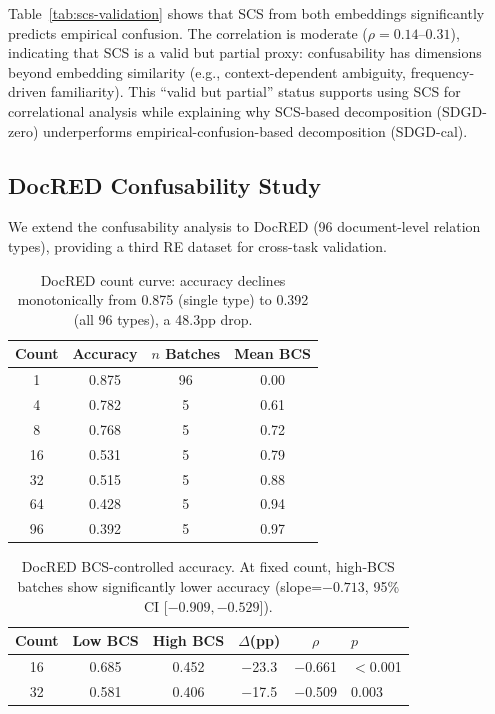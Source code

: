 \documentclass[11pt,a4paper]{article}
\begin{document}
Table~\ref{tab:scs-validation} shows that SCS from both embeddings significantly predicts empirical confusion.
The correlation is moderate ($\rho{=}0.14$--$0.31$), indicating that SCS is a valid but partial proxy: confusability has dimensions beyond embedding similarity (e.g., context-dependent ambiguity, frequency-driven familiarity).
This ``valid but partial'' status supports using SCS for correlational analysis while explaining why SCS-based decomposition (SDGD-zero) underperforms empirical-confusion-based decomposition (SDGD-cal).

\subsection{DocRED Confusability Study}
\label{sec:docred}

We extend the confusability analysis to DocRED (96 document-level relation types), providing a third RE dataset for cross-task validation.

\begin{table}[t]
\centering
\small
\begin{tabular}{cccc}
\toprule
\textbf{Count} & \textbf{Accuracy} & \textbf{$n$ Batches} & \textbf{Mean BCS} \\
\midrule
1  & 0.875 & 96 & 0.00 \\
4  & 0.782 & 5  & 0.61 \\
8  & 0.768 & 5  & 0.72 \\
16 & 0.531 & 5  & 0.79 \\
32 & 0.515 & 5  & 0.88 \\
64 & 0.428 & 5  & 0.94 \\
96 & 0.392 & 5  & 0.97 \\
\bottomrule
\end{tabular}
\caption{DocRED count curve: accuracy declines monotonically from 0.875 (single type) to 0.392 (all 96 types), a 48.3pp drop.}
\label{tab:docred-count}
\end{table}

\begin{table}[t]
\centering
\small
\begin{tabular}{cccccl}
\toprule
\textbf{Count} & \textbf{Low BCS} & \textbf{High BCS} & \textbf{$\Delta$(pp)} & \textbf{$\rho$} & \textbf{$p$} \\
\midrule
16 & 0.685 & 0.452 & $-$23.3 & $-$0.661 & $<$0.001 \\
32 & 0.581 & 0.406 & $-$17.5 & $-$0.509 & 0.003 \\
\bottomrule
\end{tabular}
\caption{DocRED BCS-controlled accuracy. At fixed count, high-BCS batches show significantly lower accuracy (slope=$-0.713$, 95\% CI [$-0.909, -0.529$]).}
\label{tab:docred-bcs}
\end{table}
\end{document}
